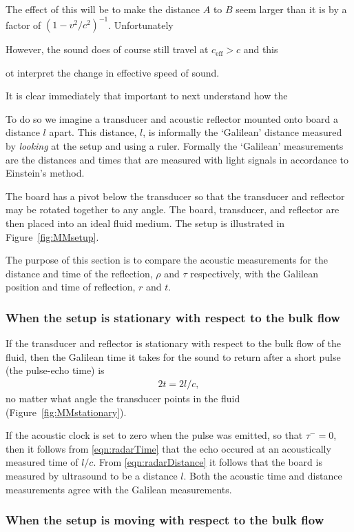 \documentclass[10pt, fleqn,draft,showtrims,oldfontcommands]{article} %
\newcommand{\eqnref}[1]{\ref{eqn:#1}}
\newcommand{\figref}[1]{Figure~\ref{fig:#1}}
\newcommand{\tm}{\tau^-}
\newcommand{\eff}{{\textrm{eff}}}
\begin{document}
The effect of this will be to make the distance $A$ to $B$ seem larger than it is  by a factor of $(1-v^2/c^2)^{-1}$.
Unfortunately 

However, the sound does of course  still travel at $c_\eff>c$ and this 

ot interpret the change in effective speed of sound.

  
It is clear immediately that  important to next understand how the 


To do so we imagine a transducer and acoustic reflector mounted onto board a distance $l$ apart.
This distance, $l$,  is informally  the `Galilean' distance measured by {\em looking} at the setup and using a ruler.
Formally the `Galilean' measurements are the distances and times that are  measured with light signals in accordance to Einstein's method.

The board  has a pivot below the transducer so that the transducer and reflector may  be rotated together to any angle.
The board, transducer, and reflector are then placed into an ideal fluid medium.
The setup is illustrated in \figref{MMsetup}.


The purpose of this section is to compare the acoustic measurements for the distance and time of the reflection, $\rho$ and $\tau$ respectively,
with the Galilean position and time of reflection, $r$ and $t$.


\subsubsection{When the setup is stationary with respect to the bulk flow}
If the transducer and reflector  is stationary with respect to the bulk flow of the fluid,
then the Galilean time it takes for the sound to return after a short pulse (the pulse-echo time)
is 
\begin{align}
  2t = 2l/c,
\end{align}
no matter what angle the transducer points in the fluid (\figref{MMstationary}).

If the acoustic clock is set to zero when the pulse was emitted, so that $\tm = 0$, 
then it follows from \eqnref{radarTime} that the echo occured  at an acoustically measured  time of $l/c$.
From \eqnref{radarDistance} it follows that the board is measured by ultrasound to be a distance $l$.
Both the acoustic time and distance measurements agree with the Galilean measurements.

\subsubsection{When the setup is moving with respect to the bulk flow}
\end{document}
